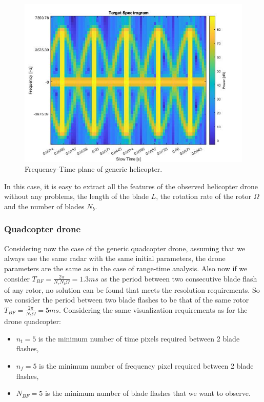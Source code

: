 \begin{figure}[h!]
\centering
\includegraphics[width=12cm]{FMCW mD analysis-chap4/img/helic_spect_f-t_dimension.jpg}
\caption{Frequency-Time plane of generic helicopter.}
\label{generic_f-t_helic}
\end{figure}

In this case, it is easy to extract all the features of the observed helicopter drone without any problems, the length of the blade $L$, the rotation rate of the rotor $\Omega$ and the number of blades $N_b$.\\

\subsubsection{Quadcopter drone}
Considering now the case of the generic quadcopter drone, assuming that we always use the same radar with the same initial parameters, the drone parameters are the same as in the case of range-time analysis. Also now if we consider $T_{BF} = \frac{2\pi}{N_r N_b \Omega} = 1.3 ms$ as the period between two consecutive blade flash of any rotor, no solution can be found that meets the resolution requirements. So we consider the period between two blade flashes to be that of the same rotor $T_{BF} = \frac{2\pi}{N_b \Omega} = 5 ms$. 
Considering the same visualization requirements as for the drone quadcopter: 
\begin{itemize}
    
    \item $n_{t} = 5$ is the minimum number of time pixels required between 2 blade flashes,
         
    \item $n_{f} = 5$ is the minimum number of frequency pixel required between 2 blade flashes,

    \item $N_{BF} = 5$ is the minimum number of blade flashes that we want to observe.
    
\end{itemize}

